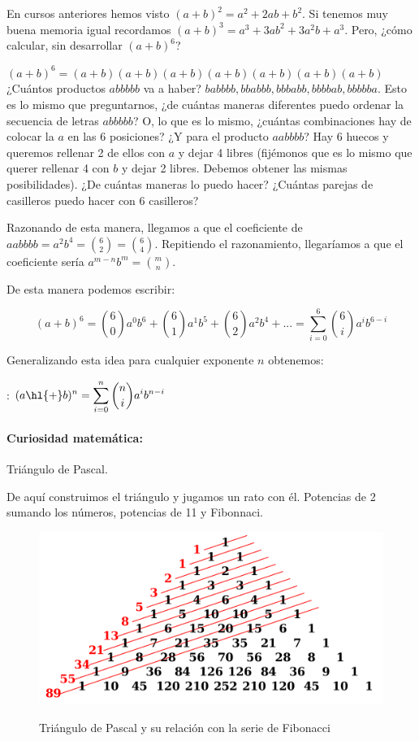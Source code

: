 
En cursos anteriores hemos visto $(a+b)^2 = a^2+2ab+b^2$. Si tenemos muy buena memoria igual recordamos $(a+b)^3 = a^3+3ab^2+3a^2b+a^3$. Pero, ¿cómo calcular, sin desarrollar $(a+b)^6$? 

$(a+b)^6 = (a+b)(a+b)(a+b)(a+b)(a+b)(a+b)(a+b)$ ¿Cuántos productos $abbbbb$ va a haber? $babbbb,bbabbb,bbbabb,bbbbab,bbbbba$. Esto es lo mismo que preguntarnos, ¿de cuántas maneras diferentes puedo ordenar la secuencia de letras $abbbbb$? O, lo que es lo mismo, ¿cuántas combinaciones hay de colocar la $a$ en las 6 posiciones?
%
¿Y para el producto $aabbbb$? Hay 6 huecos y queremos rellenar 2 de ellos con $a$ y dejar 4 libres (fijémonos que es lo mismo que querer rellenar 4 con $b$ y dejar 2 libres. Debemos obtener las mismas posibilidades). ¿De cuántas maneras lo puedo hacer? ¿Cuántas parejas de casilleros puedo hacer con 6 casilleros?

Razonando de esta manera, llegamos a que el coeficiente de $aabbbb = a^2b^4 = \binom{6}{2}=\binom{6}{4}$. Repitiendo el razonamiento, llegaríamos a que el coeficiente sería $a^{m-n}b^m = \binom{m}{n}$. 

De esta manera podemos escribir:

\[
	(a+b)^6 = \binom{6}{0}a^0b^6 + \binom{6}{1}a^1b^5 + \binom{6}{2}a^2b^4 + ... = \sum_{i=0}^6 \binom{6}{i}a^ib^{6-i}
\]

Generalizando esta idea para cualquier exponente $n$ obtenemos:

:
$
\displaystyle (a\text{\hl{+}}b)^n = \sum_{i=0}^n \binom{n}{i} a^ib^{n-i}
$

\paragraph{Curiosidad matemática:} Triángulo de Pascal.

De aquí construimos el triángulo y jugamos un rato con él. Potencias de 2 sumando los números, potencias de 11 y Fibonnaci.

\begin{figure}[hbpt]
	\centering
	\includegraphics[scale=0.17]{img/Pascal.png}
	\label{img::TrianguloPascal}
	\caption{Triángulo de Pascal y su relación con la serie de Fibonacci}
\end{figure}



